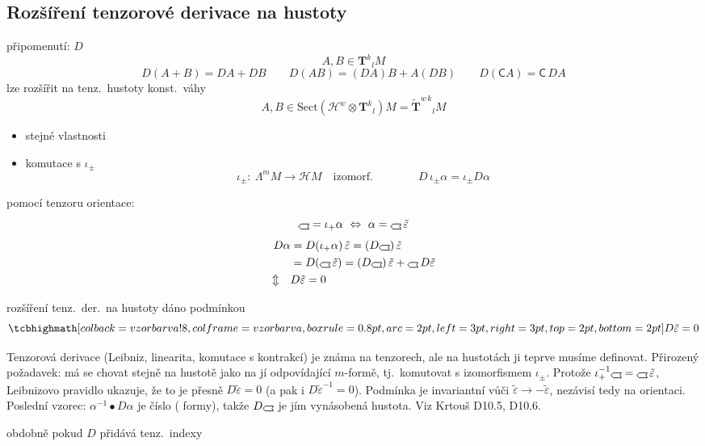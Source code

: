 \subsection{Rozšíření tenzorové derivace na hustoty}

připomenutí:  $D$
\[
  A,B\in\mathbf{T}^k{}_lM
\]
\[
  D(A+B) = DA + DB \qquad D(AB) = (DA)B + A(DB) \qquad D(\mathsf{C}A) = \mathsf{C}\,DA
\]
lze rozšířit na tenz.\ hustoty konst.\ váhy
\[
  A,B\in\mathrm{Sect}(\mathcal{H}^w\otimes\mathbf{T}^k{}_l)M = \tilde{\mathbf{T}}^{w\,k}{}_lM
\]
\begin{itemize}[nosep]
  \item[--] stejné vlastnosti
  \item[+] komutace s $\iota_\pm$
  \[
    \iota_\pm:\ \Lambda^mM\to\mathcal{H}M \quad\text{izomorf.}
    \qquad\qquad D\,\iota_\pm\alpha = \iota_\pm D\alpha
  \]
\end{itemize}
pomocí tenzoru orientace:
\[
  \gmIhustsym = \iota_+\alpha \ \Leftrightarrow\ \alpha = \gmIhustsym\,\tilde\varepsilon
\]
\begin{align*}
  D\alpha &= D(\iota_+\alpha)\,\tilde\varepsilon = (D\gmIhustsym)\,\tilde\varepsilon \\
  &= D(\gmIhustsym\,\tilde\varepsilon) = (D\gmIhustsym)\,\tilde\varepsilon + \gmIhustsym\,D\tilde\varepsilon \\
  \Updownarrow\quad & D\tilde\varepsilon = 0
\end{align*}
\begin{veta}
rozšíření tenz.\ der.\ na hustoty dáno podmínkou
\[
  \vzorec{D\tilde\varepsilon = 0}
\]
\end{veta}

\begin{vysvetleni}[proč $D\tilde\varepsilon = 0$]
Tenzorová derivace (Leibniz, linearita, komutace s kontrakcí) je známa na tenzorech, ale na hustotách ji teprve musíme definovat.
Přirozený požadavek: má se chovat stejně na hustotě jako na jí odpovídající $m$-formě, tj.\ komutovat s izomorfismem $\iota_\pm$.
Protože $\iota_+^{-1}\gmIhustsym = \gmIhustsym\,\tilde\varepsilon$, Leibnizovo pravidlo ukazuje, že to je přesně $D\tilde\varepsilon = 0$
(a pak i $D\tilde\varepsilon^{-1} = 0$). Podmínka je invariantní vůči $\tilde\varepsilon\to-\tilde\varepsilon$, nezávisí tedy na orientaci.
Poslední vzorec: $\alpha^{-1}\bullet D\alpha$ je číslo ( formy), takže $D\gmIhustsym$ je jím vynásobená hustota.
Viz Krtouš D10.5, D10.6.
\end{vysvetleni}
obdobně pokud $D$ přidává tenz.\ indexy

